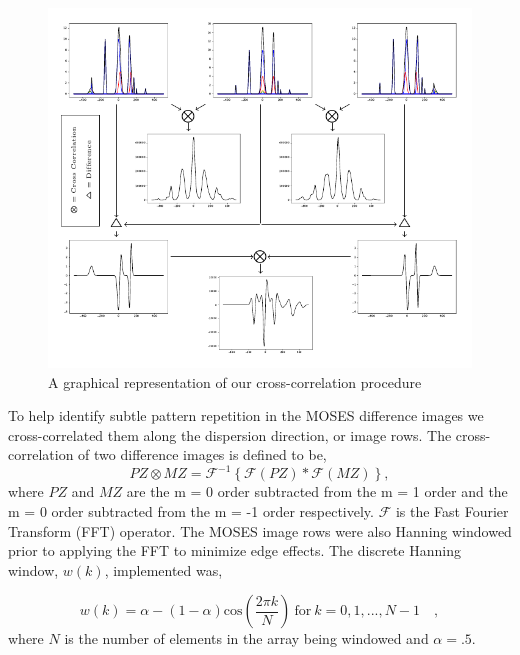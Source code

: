 \documentclass[]{solarphysics}
\begin{document}
\begin{article}
 	 	
 	 	\begin{figure}
 	 		\includegraphics[scale = 1]{methods_fig.pdf}
 	 		\caption{A graphical representation of our cross-correlation procedure}
 	 		\label{fig:methods}
 	 	\end{figure}
	
 	To help identify subtle pattern repetition in the MOSES difference images we cross-correlated them along the dispersion direction, or image rows.  The cross-correlation of two difference images is defined to be,
	 	\begin{equation}
		 	PZ \otimes MZ = \mathcal{F}^{-1} \left\{\mathcal{F}\left(PZ \right)*\mathcal{F}\left(MZ \right)  \right\},
		 	\label{eqn:cross_correlate}
	 	\end{equation}
 	where $PZ$ and $MZ$ are the m = 0 order subtracted from the m = 1 order and the m = 0 order subtracted from the m = -1 order respectively. $\mathcal{F}$ is the Fast Fourier Transform (FFT) operator.  The MOSES image rows were also Hanning windowed prior to applying the FFT to minimize edge effects.  The discrete Hanning window, $w(k)$, implemented was,
 	
		\begin{equation}
			w(k) = \alpha - (1-\alpha)\mathrm{cos}\left( \frac{2\pi k}{N} \right) \ \mathrm{for} \ k = 0,1,...,N-1 \quad ,
			\label{eqn:Hanning}
		\end{equation}
	where $N$ is the number of elements in the array being windowed and $\alpha = .5$.
 	

\end{article}
\end{document}
